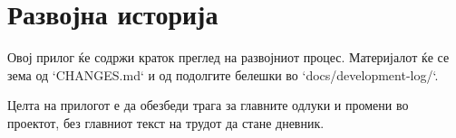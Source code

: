 \chapter{Развојна историја}

Овој прилог ќе содржи краток преглед на развојниот процес.
Материјалот ќе се зема од `CHANGES.md` и од подолгите белешки во `docs/development-log/`.

Целта на прилогот е да обезбеди трага за главните одлуки и промени во проектот, без главниот текст на трудот да стане дневник.

